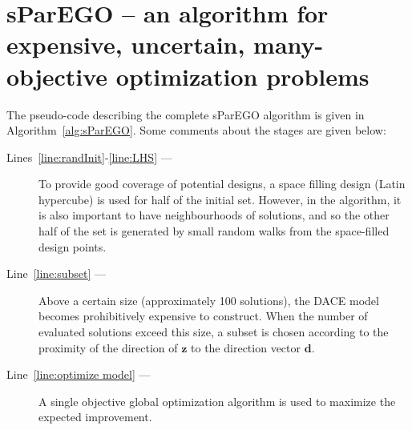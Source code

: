 \documentclass[a4paper]{article}
\newcommand{\vz}{\ensuremath{\mathbf{z}}} %
\newcommand{\vd}{\ensuremath{\mathbf{d}}} %
\begin{document}
\section{sParEGO -- an algorithm for expensive, uncertain, many-objective optimization problems}
\label{sec:sParEGO}
The pseudo-code describing the complete sParEGO algorithm is given in Algorithm~\ref{alg:sParEGO}. Some comments about the stages are given below:
\begin{description}
	\item[Lines~\ref{line:randInit}-\ref{line:LHS} ---] To provide good coverage of potential designs, a space filling design (Latin hypercube) is used for half of the initial set. However, in the algorithm, it is also important to have neighbourhoods of solutions, and so the other half of the set is generated by small random walks from the space-filled design points.
	\item[Line~\ref{line:subset} ---] Above a certain size (approximately 100 solutions), the DACE model becomes prohibitively expensive to construct. When the number of evaluated solutions exceed this size, a subset is chosen according to the proximity of the direction of $\vz$ to the direction vector $\vd$.
	\item[Line~\ref{line:optimize model} ---] A single objective global optimization algorithm is used to maximize the expected improvement.
\end{description}
\end{document}
